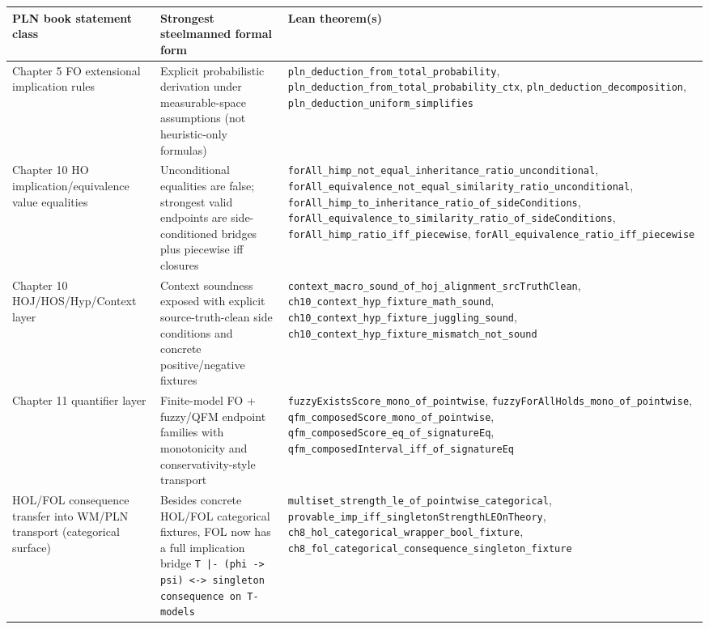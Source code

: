 \documentclass[]{article}
\newcommand{\code}[1]{\texttt{#1}}
\begin{document}
\begin{longtable}{p{}p{}p{}}
\textbf{PLN book statement class} & \textbf{Strongest steelmanned formal form} & \textbf{Lean theorem(s)} \\
\hline
Chapter 5 FO extensional implication rules & Explicit probabilistic derivation under measurable-space assumptions (not heuristic-only formulas) & \code{pln\_deduction\_from\_total\_probability},
\code{pln\_deduction\_from\_total\_probability\_ctx},
\code{pln\_deduction\_decomposition},
\code{pln\_deduction\_uniform\_simplifies} \\
\hline
Chapter 10 HO implication/equivalence value equalities & Unconditional equalities are false; strongest valid endpoints are side-conditioned bridges plus piecewise iff closures & \code{forAll\_himp\_not\_equal\_inheritance\_ratio\_unconditional},
\code{forAll\_equivalence\_not\_equal\_similarity\_ratio\_unconditional},
\code{forAll\_himp\_to\_inheritance\_ratio\_of\_sideConditions},
\code{forAll\_equivalence\_to\_similarity\_ratio\_of\_sideConditions},
\code{forAll\_himp\_ratio\_iff\_piecewise},
\code{forAll\_equivalence\_ratio\_iff\_piecewise} \\
\hline
Chapter 10 HOJ/HOS/Hyp/Context layer & Context soundness exposed with explicit source-truth-clean side conditions and concrete positive/negative fixtures & \code{context\_macro\_sound\_of\_hoj\_alignment\_srcTruthClean},
\code{ch10\_context\_hyp\_fixture\_math\_sound},
\code{ch10\_context\_hyp\_fixture\_juggling\_sound},
\code{ch10\_context\_hyp\_fixture\_mismatch\_not\_sound} \\
\hline
Chapter 11 quantifier layer & Finite-model FO + fuzzy/QFM endpoint families with monotonicity and conservativity-style transport & \code{fuzzyExistsScore\_mono\_of\_pointwise},
\code{fuzzyForAllHolds\_mono\_of\_pointwise},
\code{qfm\_composedScore\_mono\_of\_pointwise},
\code{qfm\_composedScore\_eq\_of\_signatureEq},
\code{qfm\_composedInterval\_iff\_of\_signatureEq} \\
\hline
HOL/FOL consequence transfer into WM/PLN transport (categorical surface) & Besides concrete HOL/FOL categorical fixtures, FOL now has a full implication bridge \code{T |- (phi -> psi) <-> singleton consequence on T-models} & \code{multiset\_strength\_le\_of\_pointwise\_categorical},
\code{provable\_imp\_iff\_singletonStrengthLEOnTheory},
\code{ch8\_hol\_categorical\_wrapper\_bool\_fixture},
\code{ch8\_fol\_categorical\_consequence\_singleton\_fixture} \\
\hline
\end{longtable}
\end{document}
